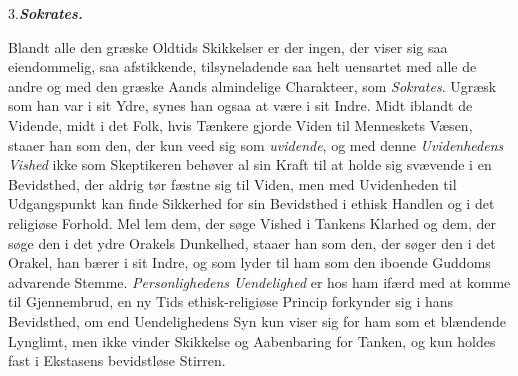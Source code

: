 %
%
\begin{center}
3.\enspace\textbf{\emph{Sokrates.}}
\end{center}

Blandt alle den græske Oldtids Skikkelser er der ingen,
der viser sig saa eiendommelig, saa afstikkende, tilsyneladende
saa helt uensartet med alle de andre og med den græske Aands
almindelige Charakteer, som \emph{Sokrates}. Ugræsk som han var
i sit Ydre, synes han ogsaa at være i sit Indre. Midt iblandt
de Vidende, midt i det Folk, hvis Tænkere gjorde Viden til
Menneskets Væsen, staaer han som den, der kun veed sig som
\emph{uvidende}, og med denne \emph{Uvidenhedens Vished} ikke som
Skeptikeren behøver al sin Kraft til at holde sig svævende i
en Bevidsthed, der aldrig tør fæstne sig til Viden, men med
Uvidenheden til Udgangspunkt kan finde Sikkerhed for sin
Bevidsthed i ethisk Handlen og i det religiøse Forhold. Mel\-%
lem dem, der søge Vished i Tankens Klarhed og dem, der
søge den i det ydre Orakels Dunkelhed, staaer han som den,
der søger den i det Orakel, han bærer i sit Indre, og som
lyder til ham som den iboende Guddoms advarende Stemme.
\emph{Personlighedens Uendelighed} er hos ham ifærd med at
komme til Gjennembrud, en ny Tids ethisk-religiøse Princip
forkynder sig i hans Bevidsthed, om end Uendelighedens Syn
kun viser sig for ham som et blændende Lynglimt, men ikke
vinder Skikkelse og Aabenbaring for Tanken, og kun holdes
fast i Ekstasens bevidstløse Stirren.

